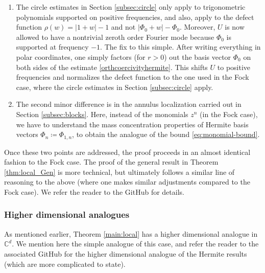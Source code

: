 \documentclass[11pt]{amsart}
\theoremstyle{remark}
\begin{document}
\begin{enumerate}
\item The circle estimates in Section \ref{subsec:circle} only apply to trigonometric polynomials supported on positive frequencies, and also, apply to the defect function $\rho(w)=|1+w|-1$ and not $|\Phi_0+w|-\Phi_0$. Moreover, $U$ is now allowed to have a nontrivial zeroth order Fourier mode because $\Phi_0$ is supported at frequency $-1$. The fix to this simple. After writing everything in polar coordinates, one simply factors (for $r>0$) out the basis vector $\Phi_0$ on both sides of the estimate \eqref{orthcoercivityhermite}. This shifts $U$ to positive frequencies and normalizes the defect function to the one used in the Fock case, where the circle estimates in Section \ref{subsec:circle} apply.
\item The second minor difference is in the annulus localization carried out in Section \ref{subsec:blocks}. Here, instead of the monomials $z^n$ (in the Fock case), we have to understand the mass concentration properties of Hermite basis vectors $\Phi_n\coloneq \Phi_{1,n}$, to obtain the analogue of the bound \eqref{eq:monomial-bound}.
\end{enumerate}
Once these two points are addressed, the proof proceeds in an almost identical fashion to the Fock case. The proof of the general result in Theorem \ref{thm:local_Gen} is more technical, but ultimately follows a similar line of reasoning to the above (where one makes similar adjustments compared to the Fock case). We refer the reader to the GitHub for details. 

\subsubsection{Higher dimensional analogues} As mentioned earlier, Theorem \ref{main:local} has a higher dimensional analogue in $\mathbb{C}^d$. We mention here the simple analogue of this case, and refer the reader to the associated GitHub for the higher dimensional analogue of the Hermite results (which are more complicated to state). 
\medskip
\end{document}
